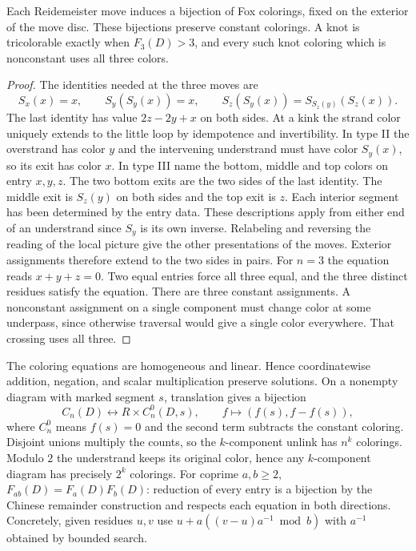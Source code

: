 \begin{theorem}
Each Reidemeister move induces a bijection of Fox colorings, fixed on the
exterior of the move disc. These bijections preserve constant colorings.
A knot is tricolorable exactly when $F_3(D)>3$, and every such knot coloring
which is nonconstant uses all three colors.
\end{theorem}
\begin{proof}
The identities needed at the three moves are
\[
 S_x(x)=x,\qquad S_y(S_y(x))=x,\qquad
 S_z(S_y(x))=S_{S_z(y)}(S_z(x)).
\]
The last identity has value $2z-2y+x$ on both sides. At a kink the strand
color uniquely extends to the little loop by idempotence and invertibility.
In type II the overstrand has color $y$ and the intervening understrand
must have color $S_y(x)$, so its exit has color $x$. In type III name the
bottom, middle and top colors on entry $x,y,z$. The two bottom exits are
the two sides of the last identity. The middle exit is $S_z(y)$ on both
sides and the top exit is $z$. Each interior segment has been determined
by the entry data. These descriptions apply from either end of an
understrand since $S_y$ is its own inverse. Relabeling and reversing the
reading of the local picture give the other presentations of the moves.
Exterior assignments therefore extend to the two sides in pairs.
For $n=3$ the equation reads $x+y+z=0$. Two equal entries force all
three equal, and the three distinct residues satisfy the equation. There
are three constant assignments. A nonconstant assignment on a single
component must change color at some underpass, since otherwise traversal
would give a single color everywhere. That crossing uses all three.
\end{proof}

The coloring equations are homogeneous and linear. Hence coordinatewise
addition, negation, and scalar multiplication preserve solutions. On a
nonempty diagram with marked segment $s$, translation gives a bijection
\[
 C_n(D)\longleftrightarrow R\times C_n^0(D,s),\qquad
 f\longmapsto(f(s),f-f(s)),
\]
where $C_n^0$ means $f(s)=0$ and the second term subtracts the constant
coloring. Disjoint unions multiply the counts, so the $k$-component
unlink has $n^k$ colorings. Modulo $2$ the understrand keeps its original
color, hence any $k$-component diagram has precisely $2^k$ colorings.
For coprime $a,b\ge2$, $F_{ab}(D)=F_a(D)F_b(D)$: reduction of every
entry is a bijection by the Chinese remainder construction and respects
each equation in both directions. Concretely, given residues $u,v$ use
$u+a((v-u)a^{-1}\bmod b)$ with $a^{-1}$ obtained by bounded search.

